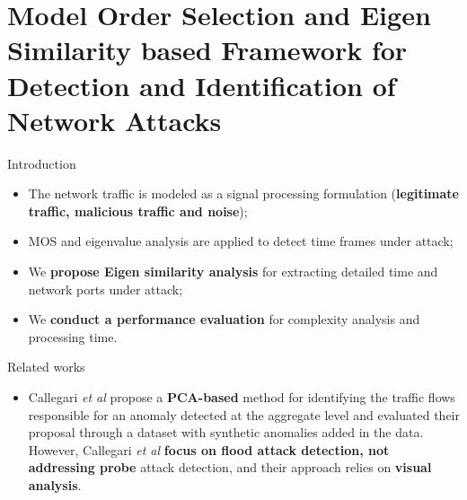 \documentclass[newPxFont, numfooter, sectionpages]{beamer}
\begin{document}
%
%
\section{Model Order Selection and Eigen Similarity based Framework for Detection and Identification of Network Attacks}
\begin{frame}[c]{Introduction}
	\begin{itemize}
		\item The network traffic is modeled as a signal processing formulation (\textbf{legitimate traffic, malicious traffic and noise});
		\item MOS and eigenvalue analysis are applied to detect time frames under attack;
		\item We \textbf{propose Eigen similarity analysis} for extracting detailed time and network ports under attack;
		\item We \textbf{conduct a performance evaluation} for complexity analysis and processing time.
	\end{itemize}
\end{frame}
\begin{frame}[c]{Related works}
	
	\begin{itemize}
		\item Callegari \emph{et al} \cite{Zonglin2009} propose a \textbf{PCA-based} method for identifying the traffic flows responsible for an anomaly detected at the aggregate level and evaluated their proposal through a dataset with synthetic anomalies added in the data. However, Callegari \emph{et al} \textbf{focus on flood attack detection, not addressing probe} attack detection, and their approach relies on \textbf{visual analysis}.
	\end{itemize}
	
\end{frame}
\end{document}
